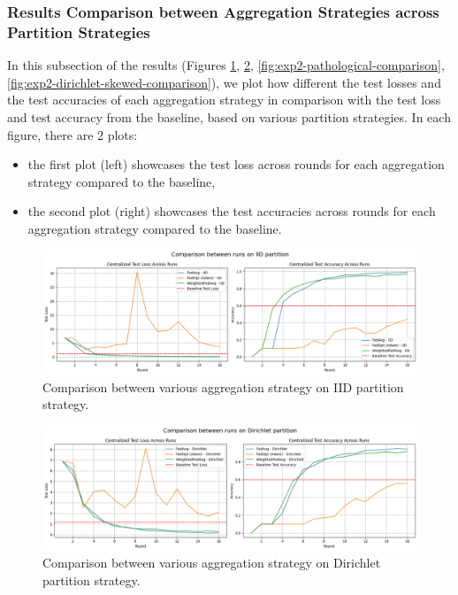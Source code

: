 \documentclass[11pt]{article}
\begin{document}
    \subsubsection{Results Comparison between Aggregation Strategies across Partition Strategies}
    In this subsection of the results (Figures \ref{fig:exp2-iid-comparison}, \ref{fig:exp2-dirichlet-comparison}, \ref{fig:exp2-pathological-comparison}, \ref{fig:exp2-dirichlet-skewed-comparison}), we plot how different the test losses and the test accuracies of each aggregation strategy in comparison with the test loss and test accuracy from the baseline, based on various partition strategies. In each figure, there are 2 plots:
    \begin{itemize}
        \item the first plot (left) showcases the test loss across rounds for each aggregation strategy compared to the baseline,
        \item the second plot (right) showcases the test accuracies across rounds for each aggregation strategy compared to the baseline.
    \end{itemize}

    \begin{figure}[h!]
        \centering
        \includegraphics[width=1\linewidth]{img/experiment_2/iid-comparison}
        \caption{Comparison between various aggregation strategy on IID partition strategy.}
        \label{fig:exp2-iid-comparison}
    \end{figure}

    \begin{figure}[h!]
        \centering
        \includegraphics[width=1\linewidth]{img/experiment_2/dirichlet-comparison}
        \caption{Comparison between various aggregation strategy on Dirichlet partition strategy.}
        \label{fig:exp2-dirichlet-comparison}
    \end{figure}
\end{document}
